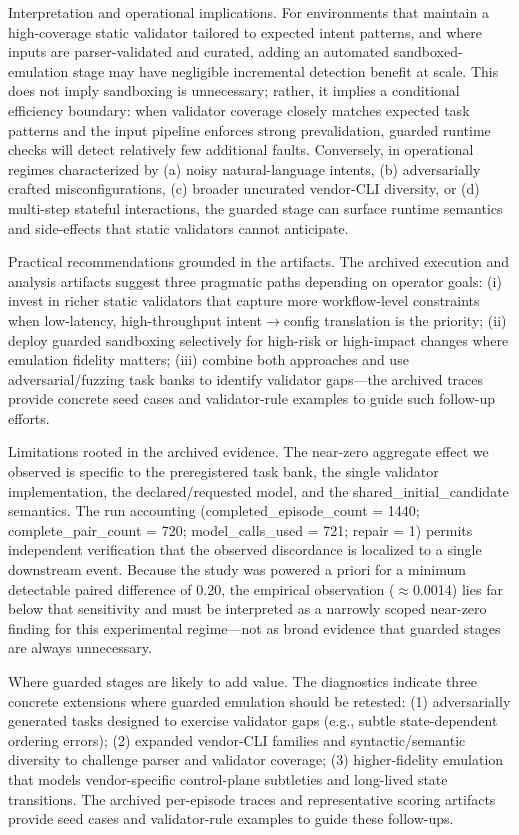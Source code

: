 \documentclass[conference]{IEEEtran}
\begin{document}
Interpretation and operational implications. For environments that maintain a high-coverage static validator tailored to expected intent patterns, and where inputs are parser-validated and curated, adding an automated sandboxed-emulation stage may have negligible incremental detection benefit at scale. This does not imply sandboxing is unnecessary; rather, it implies a conditional efficiency boundary: when validator coverage closely matches expected task patterns and the input pipeline enforces strong prevalidation, guarded runtime checks will detect relatively few additional faults. Conversely, in operational regimes characterized by (a) noisy natural-language intents, (b) adversarially crafted misconfigurations, (c) broader uncurated vendor-CLI diversity, or (d) multi-step stateful interactions, the guarded stage can surface runtime semantics and side-effects that static validators cannot anticipate.

Practical recommendations grounded in the artifacts. The archived execution and analysis artifacts suggest three pragmatic paths depending on operator goals: (i) invest in richer static validators that capture more workflow-level constraints when low-latency, high-throughput intent\ensuremath{\rightarrow}config translation is the priority; (ii) deploy guarded sandboxing selectively for high-risk or high-impact changes where emulation fidelity matters; (iii) combine both approaches and use adversarial/fuzzing task banks to identify validator gaps---the archived traces provide concrete seed cases and validator-rule examples to guide such follow-up efforts.

Limitations rooted in the archived evidence. The near-zero aggregate effect we observed is specific to the preregistered task bank, the single validator implementation, the declared/requested model, and the shared\_initial\_candidate semantics. The run accounting (completed\_episode\_count = 1440; complete\_pair\_count = 720; model\_calls\_used = 721; repair = 1) permits independent verification that the observed discordance is localized to a single downstream event. Because the study was powered a priori for a minimum detectable paired difference of 0.20, the empirical observation (\ensuremath{\approx}0.0014) lies far below that sensitivity and must be interpreted as a narrowly scoped near-zero finding for this experimental regime---not as broad evidence that guarded stages are always unnecessary.

Where guarded stages are likely to add value. The diagnostics indicate three concrete extensions where guarded emulation should be retested: (1) adversarially generated tasks designed to exercise validator gaps (e.g., subtle state-dependent ordering errors); (2) expanded vendor-CLI families and syntactic/semantic diversity to challenge parser and validator coverage; (3) higher-fidelity emulation that models vendor-specific control-plane subtleties and long-lived state transitions. The archived per-episode traces and representative scoring artifacts provide seed cases and validator-rule examples to guide these follow-ups.
\end{document}
